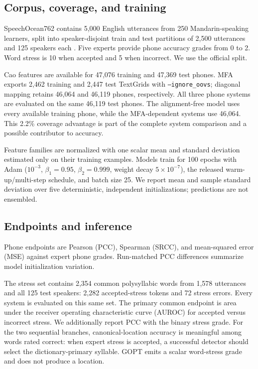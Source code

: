 \documentclass[10pt,conference]{IEEEtran}
\begin{document}
\subsection{Corpus, coverage, and training}

SpeechOcean762 contains 5,000 English utterances from 250 Mandarin-speaking
learners, split into speaker-disjoint train and test partitions of 2,500
utterances and 125 speakers each \cite{zhang2021speechocean762}. Five experts
provide phone accuracy grades from 0 to 2. Word stress is 10 when accepted and
5 when incorrect. We use the official split.

Cao features are available for 47,076 training and 47,369 test phones. MFA
exports 2,462 training and 2,447 test TextGrids with
\texttt{--ignore\_oovs}; diagonal mapping retains 46,064 and 46,119 phones,
respectively. All three phone systems are evaluated on the same 46,119 test
phones. The alignment-free model uses every available training phone, while
the MFA-dependent systems use 46,064. This 2.2\% coverage advantage is part of
the complete system comparison and a possible contributor to accuracy.

Feature families are normalized with one scalar mean and standard deviation
estimated only on their training examples. Models train for 100 epochs with
Adam ($10^{-3}$, $\beta_1=0.95$, $\beta_2=0.999$, weight decay
$5\times10^{-7}$), the released warm-up/multi-step schedule, and batch size
25. We report mean and sample standard deviation over five deterministic,
independent initializations; predictions are not ensembled.

\subsection{Endpoints and inference}

Phone endpoints are Pearson (PCC), Spearman (SRCC), and mean-squared error
(MSE) against expert phone grades. Run-matched PCC differences summarize model
initialization variation.

The stress set contains 2,354 common polysyllabic words from 1,578 utterances
and all 125 test speakers: 2,282 accepted-stress tokens and 72 stress errors.
Every system is evaluated on this same set. The primary common endpoint is area
under the receiver operating characteristic curve (AUROC) for accepted versus
incorrect stress. We additionally report PCC with the binary stress grade. For
the two sequential branches, canonical-location accuracy is meaningful among
words rated correct: when expert stress is accepted, a successful detector
should select the dictionary-primary syllable. GOPT emits a scalar word-stress
grade and does not produce a location.
\end{document}
